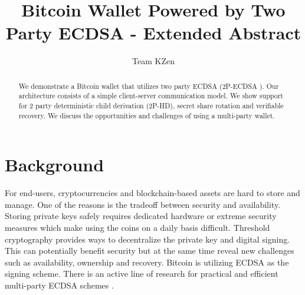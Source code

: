 \documentclass[runningheads]{llncs}
\begin{document}
%
\title{Bitcoin Wallet Powered by Two Party ECDSA - Extended Abstract}
%
%
\author{Team KZen}
%
%
%
\maketitle              %
%
\begin{abstract}
We demonstrate a Bitcoin wallet that utilizes two party ECDSA (2P-ECDSA \cite{lindell17}). Our architecture consists of a simple client-server communication model. We show support for 2 party deterministic child derivation (2P-HD), secret share rotation and verifiable recovery. We discuss the opportunities and challenges of using a multi-party wallet.


\end{abstract}
%
%
%
\section{Background}
For end-users, cryptocurrencies and blockchain-based assets are hard to store and manage. One of the reasons is the tradeoff between security and availability. Storing private keys safely requires dedicated hardware or extreme security measures which make using the coins on a daily basis difficult. Threshold cryptography provides ways to decentralize the private key and digital signing. This can potentially benefit security but at the same time reveal new challenges such as availability, ownership and recovery.
Bitcoin is utilizing ECDSA as the signing scheme. There is an active line of research for practical and efficient multi-party ECDSA schemes \cite{mackenzie,boneh17,lindell17,doerner,goldfeder18,lindell18}.
\end{document}
